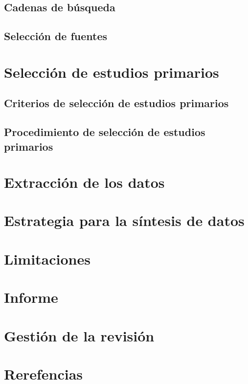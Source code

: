 \documentclass{article}
\begin{document}
\subsection{Cadenas de búsqueda}

\subsection{Selección de fuentes}
\section{Selección de estudios primarios}
\subsection{Criterios de selección de estudios primarios}
\subsection{Procedimiento de selección de estudios primarios}
\section{Extracción de los datos}
\section{Estrategia para la síntesis de datos}
\section{Limitaciones}
\section{Informe}
\section{Gestión de la revisión}
\section{Rerefencias}
\end{document}
